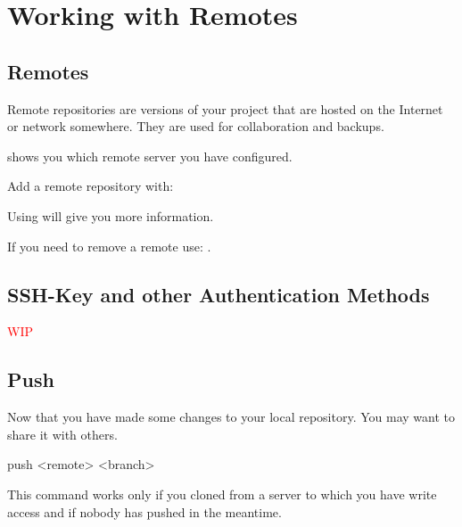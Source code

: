 \chapter{Working with Remotes}
\chapteroverlayB

\section{Remotes}
Remote repositories are versions of your project that are hosted on the Internet or network somewhere.
They are used for collaboration and backups.

\noindent{} shows you which remote server you have configured.

\noindent Add a remote repository with: 

\noindent Using  will give you more information.

\noindent If you need to remove a remote use: .

\section{SSH-Key and other Authentication Methods}

\textcolor{red}{WIP}

\section{Push}
Now that you have made some changes to your local repository. You may want to share it with others.
\begin{gitBashBox}
push <remote> <branch>
\end{gitBashBox}
This command works only if you cloned from a server to which you have write access and if nobody has pushed in the meantime.


